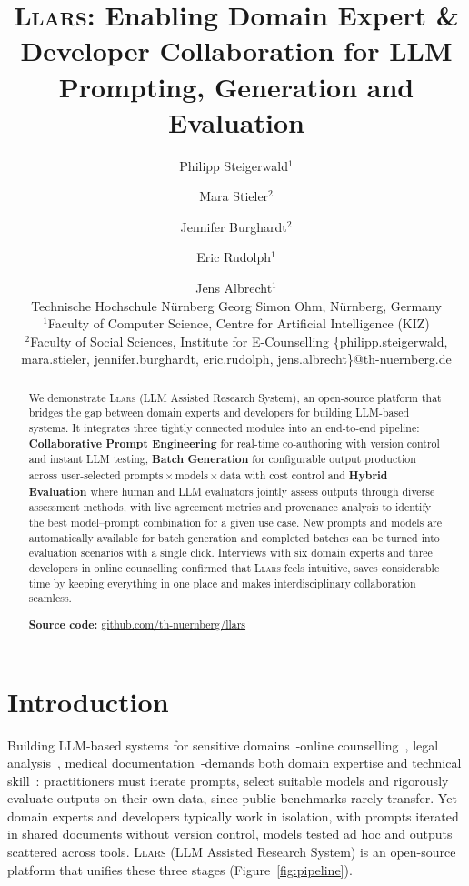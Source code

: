 \documentclass{article}
\title{\textsc{Llars}: Enabling Domain Expert \& Developer Collaboration for LLM Prompting, Generation and Evaluation}
\author{
Philipp Steigerwald$^1$\and
Mara Stieler$^2$\and
Jennifer Burghardt$^2$\and
Eric Rudolph$^1$\and
Jens Albrecht$^1$\\
\affiliations
Technische Hochschule Nürnberg Georg Simon Ohm, Nürnberg, Germany\\
$^1$Faculty of Computer Science, Centre for Artificial Intelligence (KIZ)\\
$^2$Faculty of Social Sciences, Institute for E-Counselling
\emails
\{philipp.steigerwald, mara.stieler, jennifer.burghardt, eric.rudolph, jens.albrecht\}@th-nuernberg.de
}
\begin{document}
\maketitle

\begin{abstract}
We demonstrate \textsc{Llars} (LLM Assisted Research System), an open-source platform that bridges the gap between domain experts and developers for building LLM-based systems.
It integrates three tightly connected modules into an end-to-end pipeline:
\textbf{Collaborative Prompt Engineering} for real-time co-authoring with version control and instant LLM testing,
\textbf{Batch Generation} for configurable output production across user-selected prompts\,$\times$\,models\,$\times$\,data with cost control and
\textbf{Hybrid Evaluation} where human and LLM evaluators jointly assess outputs through diverse assessment methods, with live agreement metrics and provenance analysis to identify the best model--prompt combination for a given use case.
New prompts and models are automatically available for batch generation and completed batches can be turned into evaluation scenarios with a single click.
Interviews with six domain experts and three developers in online counselling confirmed that \textsc{Llars} feels intuitive, saves considerable time by keeping everything in one place and makes interdisciplinary collaboration seamless.

\vspace{0.3em}
\noindent\textbf{Source code:} \url{github.com/th-nuernberg/llars} %
\end{abstract}

\section{Introduction}


Building LLM-based systems for sensitive domains~\cite{chen2024critical,ling2025domain}\--online counselling~\cite{stade2024behavioral}, legal analysis~\cite{katz2024bar}, medical documentation~\cite{vanveen2024clinical}\--demands both domain expertise and technical skill~\cite{zamfirescu2023johnny,schulhoff2024prompt}: practitioners must iterate prompts, select suitable models and rigorously evaluate outputs on their own data, since public benchmarks rarely transfer.
Yet domain experts and developers typically work in isolation, with prompts iterated in shared documents without version control, models tested ad hoc and outputs scattered across tools.
\textsc{Llars} (LLM Assisted Research System) is an open-source platform that unifies these three stages (Figure~\ref{fig:pipeline}).
\end{document}
